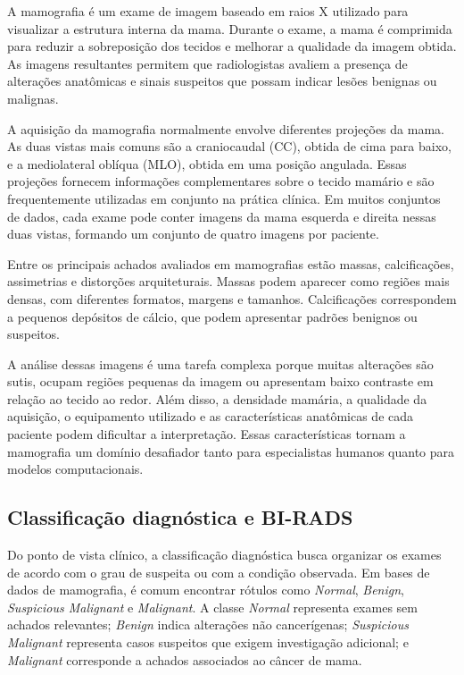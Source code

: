 \documentclass[
    12pt,
    openright,
    oneside,
    a4paper,
    english,
    brazil
]{abntex2}
\begin{document}
A mamografia é um exame de imagem baseado em raios X utilizado para visualizar a estrutura interna da mama. Durante o exame, a mama é comprimida para reduzir a sobreposição dos tecidos e melhorar a qualidade da imagem obtida. As imagens resultantes permitem que radiologistas avaliem a presença de alterações anatômicas e sinais suspeitos que possam indicar lesões benignas ou malignas.

A aquisição da mamografia normalmente envolve diferentes projeções da mama. As duas vistas mais comuns são a craniocaudal (CC), obtida de cima para baixo, e a mediolateral oblíqua (MLO), obtida em uma posição angulada. Essas projeções fornecem informações complementares sobre o tecido mamário e são frequentemente utilizadas em conjunto na prática clínica. Em muitos conjuntos de dados, cada exame pode conter imagens da mama esquerda e direita nessas duas vistas, formando um conjunto de quatro imagens por paciente.

Entre os principais achados avaliados em mamografias estão massas, calcificações, assimetrias e distorções arquiteturais. Massas podem aparecer como regiões mais densas, com diferentes formatos, margens e tamanhos. Calcificações correspondem a pequenos depósitos de cálcio, que podem apresentar padrões benignos ou suspeitos. 

A análise dessas imagens é uma tarefa complexa porque muitas alterações são sutis, ocupam regiões pequenas da imagem ou apresentam baixo contraste em relação ao tecido ao redor. Além disso, a densidade mamária, a qualidade da aquisição, o equipamento utilizado e as características anatômicas de cada paciente podem dificultar a interpretação. Essas características tornam a mamografia um domínio desafiador tanto para especialistas humanos quanto para modelos computacionais.

\subsection{Classificação diagnóstica e BI-RADS}

Do ponto de vista clínico, a classificação diagnóstica busca organizar os exames de acordo com o grau de suspeita ou com a condição observada. Em bases de dados de mamografia, é comum encontrar rótulos como \textit{Normal}, \textit{Benign}, \textit{Suspicious Malignant} e \textit{Malignant}. A classe \textit{Normal} representa exames sem achados relevantes; \textit{Benign} indica alterações não cancerígenas; \textit{Suspicious Malignant} representa casos suspeitos que exigem investigação adicional; e \textit{Malignant} corresponde a achados associados ao câncer de mama.
\end{document}

